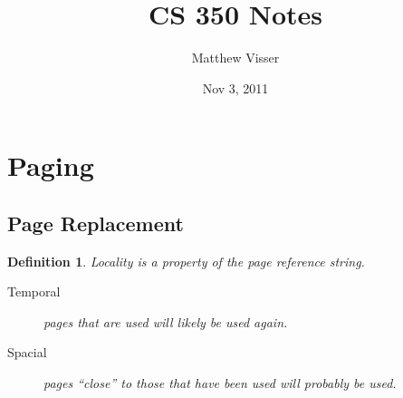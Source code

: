 \documentclass[12pt]{article}
\newtheorem{defn}{Definition}[subsection]
\begin{document}
\title{CS 350 Notes}
\author{Matthew Visser}
\date{Nov  3, 2011}
\maketitle

\section{Paging}

\subsection{Page Replacement}

\begin{defn}
	\emph{Locality} is a property of the page reference string.  
	\begin{description}
		\item[Temporal] pages that are used will likely be used again.
		\item[Spacial] pages ``close'' to those that have been used will
			probably be used.
	\end{description}
\end{defn}
\end{document}
